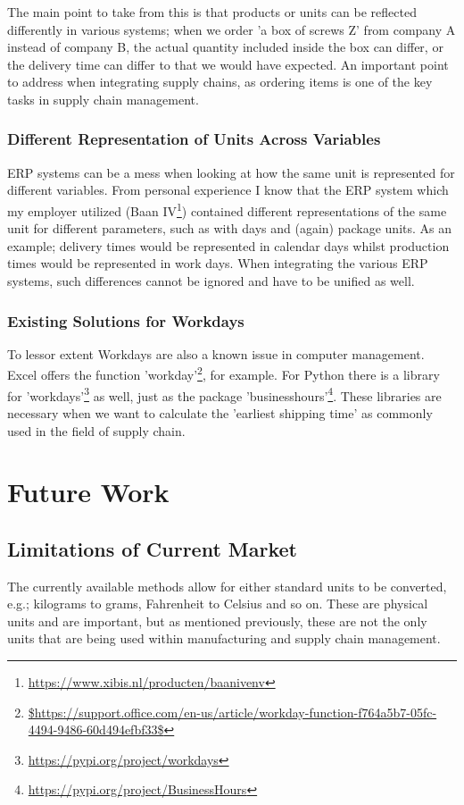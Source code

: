 \documentclass[sigchi, nonacm]{acmart}
\begin{document}
The main point to take from this is that products or units can be reflected differently in various systems; when we order 'a box of screws Z' from company A instead of company B, the actual quantity included inside the box can differ, or the delivery time can differ to that we would have expected. An important point to address when integrating supply chains, as ordering items is one of the key tasks in supply chain management.

\subsubsection{Different Representation of Units Across Variables}
ERP systems can be a mess when looking at how the same unit is represented for different variables. From personal experience I know that the ERP system which my employer utilized (Baan IV\footnote{\raggedright\url{https://www.xibis.nl/producten/baanivenv}}) contained different representations of the same unit for different parameters, such as with days and (again) package units. As an example; delivery times would be represented in calendar days whilst production times would be represented in work days. When integrating the various ERP systems, such differences cannot be ignored and have to be unified as well.

\subsubsection{Existing Solutions for Workdays}
To lessor extent Workdays are also a known issue in computer management. Excel offers the function 'workday'\footnote{\raggedright{\url{$https://support.office.com/en-us/article/workday-function-f764a5b7-05fc-4494-9486-60d494efbf33$}}}, for example. For Python there is a library for 'workdays'\footnote{\raggedright{\url{https://pypi.org/project/workdays}}} as well, just as the package 'businesshours'\footnote{\raggedright{\url{https://pypi.org/project/BusinessHours}}}. These libraries are necessary when we want to calculate the 'earliest shipping time' as commonly used in the field of supply chain.



\section{Future Work}

\subsection{Limitations of Current Market}
The currently available methods allow for either standard units to be converted, e.g.; kilograms to grams, Fahrenheit to Celsius and so on. These are physical units and are important, but as mentioned previously, these are not the only units that are being used within manufacturing and supply chain management.
\end{document}
